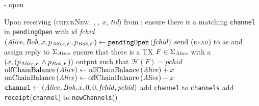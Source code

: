 \begin{systembox}{\fpaynet - open}
\begin{algorithmic}[1]
    \State Upon receiving (\textsc{checkNew}, \alice, \bob, $x$, \textit{tid})
    from \alice:
    \Indent
      \State ensure there is a matching \texttt{channel} in \texttt{pendingOpen}
      with id \textit{fchid}
      \State $\left(\mathit{Alice}, \mathit{Bob}, x, p_{\mathit{Alice}, F}, p_{\mathit{Bob}, F}\right) \gets
      \mathtt{pendingOpen}\left(\mathit{fchid}\right)$
      \State send (\textsc{read}) to \ledger{} as \alice{} and assign reply to
      $\Sigma_{\mathit{Alice}}$
      \State ensure that there is a TX $F \in \Sigma_{\mathit{Alice}}$ with a $\left(x,
      \left(p_{\mathit{Alice}, F} \wedge p_{\mathit{Bob}, F}\right)\right)$ output such that
      $\mathcal{H}\left(F\right) = \mathit{pchid}$
      \State $\mathrm{offChainBalance}\left(\mathit{Alice}\right) \gets
      \mathrm{offChainBalance}\left(\mathit{Alice}\right) + x$ 
      \State $\mathrm{onChainBalance}\left(\mathit{Alice}\right) \gets
      \mathrm{offChainBalance}\left(\mathit{Alice}\right) - x$
      \State $\mathtt{channel} \gets \left(\mathit{Alice}, \mathit{Bob}, x, 0, 0,
      \mathit{fchid}, \mathit{pchid}\right)$
      \State add \texttt{channel} to \texttt{channels}
      \State add \texttt{receipt}(\texttt{channel}) to
      \texttt{newChannels}(\alice)
    \EndIndent
  \end{algorithmic}
\end{systembox}

